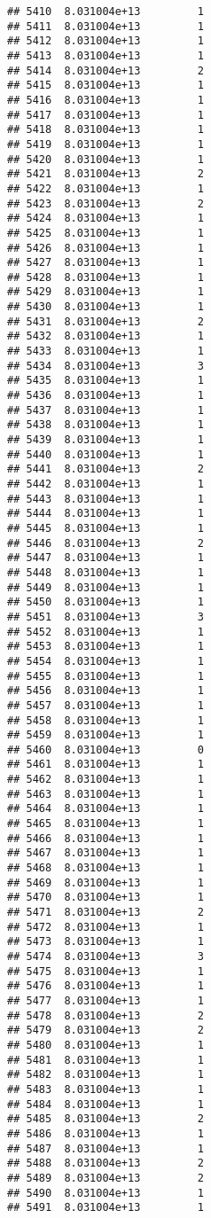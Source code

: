 \documentclass[
]{article}
\begin{document}
\begin{verbatim}
## 5410  8.031004e+13         1
## 5411  8.031004e+13         1
## 5412  8.031004e+13         1
## 5413  8.031004e+13         1
## 5414  8.031004e+13         2
## 5415  8.031004e+13         1
## 5416  8.031004e+13         1
## 5417  8.031004e+13         1
## 5418  8.031004e+13         1
## 5419  8.031004e+13         1
## 5420  8.031004e+13         1
## 5421  8.031004e+13         2
## 5422  8.031004e+13         1
## 5423  8.031004e+13         2
## 5424  8.031004e+13         1
## 5425  8.031004e+13         1
## 5426  8.031004e+13         1
## 5427  8.031004e+13         1
## 5428  8.031004e+13         1
## 5429  8.031004e+13         1
## 5430  8.031004e+13         1
## 5431  8.031004e+13         2
## 5432  8.031004e+13         1
## 5433  8.031004e+13         1
## 5434  8.031004e+13         3
## 5435  8.031004e+13         1
## 5436  8.031004e+13         1
## 5437  8.031004e+13         1
## 5438  8.031004e+13         1
## 5439  8.031004e+13         1
## 5440  8.031004e+13         1
## 5441  8.031004e+13         2
## 5442  8.031004e+13         1
## 5443  8.031004e+13         1
## 5444  8.031004e+13         1
## 5445  8.031004e+13         1
## 5446  8.031004e+13         2
## 5447  8.031004e+13         1
## 5448  8.031004e+13         1
## 5449  8.031004e+13         1
## 5450  8.031004e+13         1
## 5451  8.031004e+13         3
## 5452  8.031004e+13         1
## 5453  8.031004e+13         1
## 5454  8.031004e+13         1
## 5455  8.031004e+13         1
## 5456  8.031004e+13         1
## 5457  8.031004e+13         1
## 5458  8.031004e+13         1
## 5459  8.031004e+13         1
## 5460  8.031004e+13         0
## 5461  8.031004e+13         1
## 5462  8.031004e+13         1
## 5463  8.031004e+13         1
## 5464  8.031004e+13         1
## 5465  8.031004e+13         1
## 5466  8.031004e+13         1
## 5467  8.031004e+13         1
## 5468  8.031004e+13         1
## 5469  8.031004e+13         1
## 5470  8.031004e+13         1
## 5471  8.031004e+13         2
## 5472  8.031004e+13         1
## 5473  8.031004e+13         1
## 5474  8.031004e+13         3
## 5475  8.031004e+13         1
## 5476  8.031004e+13         1
## 5477  8.031004e+13         1
## 5478  8.031004e+13         2
## 5479  8.031004e+13         2
## 5480  8.031004e+13         1
## 5481  8.031004e+13         1
## 5482  8.031004e+13         1
## 5483  8.031004e+13         1
## 5484  8.031004e+13         1
## 5485  8.031004e+13         2
## 5486  8.031004e+13         1
## 5487  8.031004e+13         1
## 5488  8.031004e+13         2
## 5489  8.031004e+13         2
## 5490  8.031004e+13         1
## 5491  8.031004e+13         1

\end{verbatim}
\end{document}
